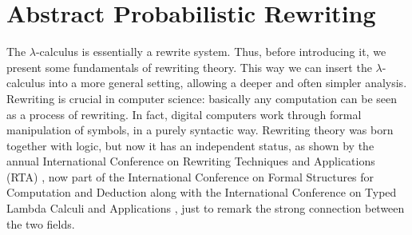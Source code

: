\chapter{Abstract Probabilistic Rewriting}\label{ch:mathtest} %
The $\lambda$-calculus is essentially a rewrite system. Thus, before introducing it, we present some fundamentals of rewriting theory. This way we can insert the $\lambda$-calculus into a more general setting, allowing a deeper and often simpler analysis. Rewriting is crucial in computer science: basically any computation can be seen as a process of rewriting. In fact, digital computers work through formal manipulation of symbols, in a purely syntactic way. Rewriting theory was born together with logic, but now it has an independent status, as shown by the annual International Conference on Rewriting Techniques and Applications (RTA) \cite{noauthor_rta_nodate}, now part of the International Conference on Formal Structures for Computation and Deduction along with the  International Conference on Typed Lambda Calculi and Applications \cite{noauthor_notitle_nodate}, just to remark the strong connection between the two fields.
